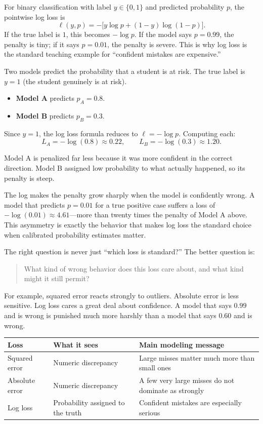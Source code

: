 For binary classification with label \(y \in \{0,1\}\) and predicted probability \(p\), the pointwise log loss is
\[
\ell(y,p) = -\bigl[y\log p + (1-y)\log(1-p)\bigr].
\]
If the true label is \(1\), this becomes \(-\log p\). If the model says \(p=0.99\), the penalty is tiny; if it says \(p=0.01\), the penalty is severe. This is why log loss is the standard teaching example for ``confident mistakes are expensive.''

\begin{example}
Two models predict the probability that a student is at risk. The true label is \(y=1\) (the student genuinely is at risk).

\begin{itemize}[leftmargin=*]
\item \textbf{Model A} predicts \(p_A = 0.8\).
\item \textbf{Model B} predicts \(p_B = 0.3\).
\end{itemize}

Since \(y=1\), the log loss formula reduces to \(\ell = -\log p\). Computing each:
\[
L_A = -\log(0.8) \approx 0.22,
\qquad
L_B = -\log(0.3) \approx 1.20.
\]

Model A is penalized far less because it was more confident in the correct direction. Model B assigned low probability to what actually happened, so its penalty is steep.

The log makes the penalty grow sharply when the model is confidently wrong. A model that predicts \(p = 0.01\) for a true positive case suffers a loss of \(-\log(0.01) \approx 4.61\)---more than twenty times the penalty of Model A above. This asymmetry is exactly the behavior that makes log loss the standard choice when calibrated probability estimates matter.
\end{example}

The right question is never just ``which loss is standard?'' The better question is:

\begin{quote}
What kind of wrong behavior does this loss care about, and what kind might it still permit?
\end{quote}

For example, squared error reacts strongly to outliers. Absolute error is less sensitive. Log loss cares a great deal about confidence. A model that says \(0.99\) and is wrong is punished much more harshly than a model that says \(0.60\) and is wrong.

\begin{center}
\small
\begin{tabular}{p{2.3cm}p{2.77cm}p{4.46cm}}
\toprule
Loss & What it sees & Main modeling message \\
\midrule
Squared error & Numeric discrepancy & Large misses matter much more than small ones \\
Absolute error & Numeric discrepancy & A few very large misses do not dominate as strongly \\
Log loss & Probability assigned to the truth & Confident mistakes are especially serious \\
\bottomrule
\end{tabular}
\end{center}

